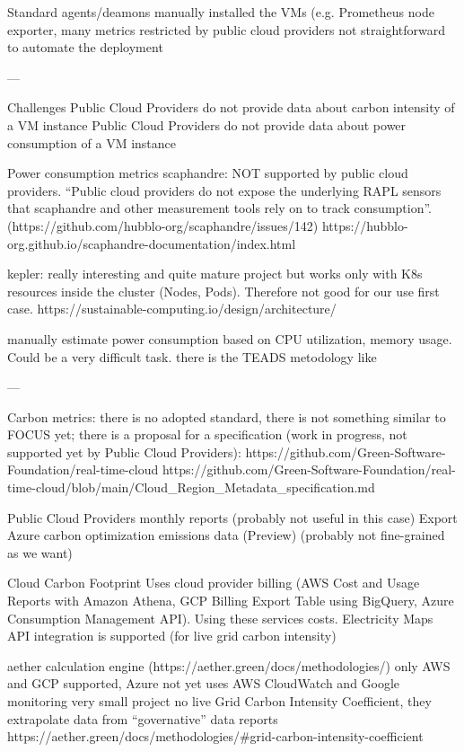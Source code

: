 Standard agents/deamons manually installed the VMs (e.g. Prometheus node exporter, 
many metrics restricted by public cloud providers
not straightforward to automate the deployment


---

Challenges
Public Cloud Providers do not provide data about carbon intensity of a VM instance
Public Cloud Providers do not provide data about power consumption of a VM instance

Power consumption metrics
scaphandre: NOT supported by public cloud providers. “Public cloud providers do not expose the underlying RAPL sensors that scaphandre and other measurement tools rely on to track consumption”. (https://github.com/hubblo-org/scaphandre/issues/142)
https://hubblo-org.github.io/scaphandre-documentation/index.html

kepler: really interesting and quite mature project but works only with K8s resources inside the cluster (Nodes, Pods). Therefore not good for our use first case.
https://sustainable-computing.io/design/architecture/


manually estimate power consumption based on CPU utilization, memory usage. Could be a very difficult task. 
there is the TEADS metodology like 



---


Carbon metrics:
there is no adopted standard, there is not something similar to FOCUS yet;
there is a proposal for a specification (work in progress, not supported yet by Public Cloud Providers): 
https://github.com/Green-Software-Foundation/real-time-cloud 
https://github.com/Green-Software-Foundation/real-time-cloud/blob/main/Cloud_Region_Metadata_specification.md 


Public Cloud Providers monthly reports (probably not useful in this case)
Export Azure carbon optimization emissions data (Preview) (probably not fine-grained as we want)

Cloud Carbon Footprint
Uses cloud provider billing (AWS Cost and Usage Reports with Amazon Athena, GCP Billing Export Table using BigQuery, Azure Consumption 
Management API). Using these services costs.
Electricity Maps API integration is supported (for live grid carbon intensity)

 
aether calculation engine (https://aether.green/docs/methodologies/) 
only AWS and GCP supported, Azure not yet
uses AWS CloudWatch and Google monitoring
very small project
no live Grid Carbon Intensity Coefficient, they extrapolate data from “governative” data reports
https://aether.green/docs/methodologies/#grid-carbon-intensity-coefficient


